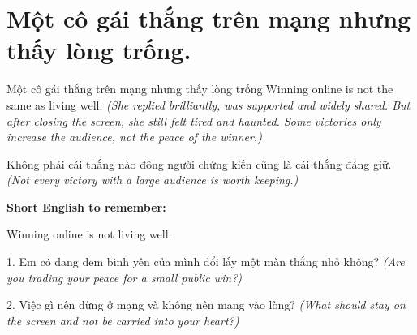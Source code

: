 \section{Một cô gái thắng trên mạng nhưng thấy lòng trống.}
\begin{truyen}{Một cô gái thắng trên mạng nhưng thấy lòng trống.}{Winning online is not the same as living well.}
\textit{(She replied brilliantly, was supported and widely shared. But after closing the screen, she still felt tired and haunted. Some victories only increase the audience, not the peace of the winner.)}
\end{truyen}
\begin{baihoc}
Không phải cái thắng nào đông người chứng kiến cũng là cái thắng đáng giữ.
\textit{(Not every victory with a large audience is worth keeping.)}
\end{baihoc}
\begin{ghinhoanh}\textbf{Short English to remember:}

Winning online is not living well.
\end{ghinhoanh}
\begin{tuhocnhanh}
1. Em có đang đem bình yên của mình đổi lấy một màn thắng nhỏ không? \textit{(Are you trading your peace for a small public win?)}

2. Việc gì nên dừng ở mạng và không nên mang vào lòng? \textit{(What should stay on the screen and not be carried into your heart?)}
\end{tuhocnhanh}
\ngancach

